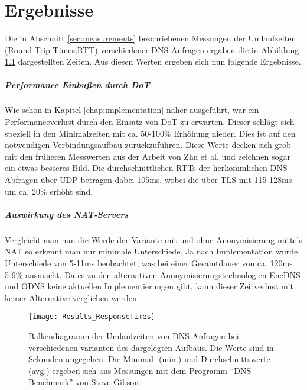 \chapter{Ergebnisse}
\label{chap:results}

Die in Abschnitt \ref{sec:measurements} beschriebenen Messungen der Umlaufzeiten (Round-Trip-Times;RTT) verschiedener DNS-Anfragen ergaben die in Abbildung \ref{img:results-times} dargestellten Zeiten. Aus diesen Werten ergeben sich nun folgende Ergebnisse.

\paragraph{Performance Einbußen durch DoT}
Wie schon in Kapitel \ref{chap:implementation} näher ausgeführt, war ein Performanceverlust durch den Einsatz von DoT zu erwarten. Dieser schlägt sich speziell in den Minimalzeiten mit ca. 50-100\% Erhöhung nieder. Dies ist auf den notwendigen Verbindungsaufbau zurückzuführen. Diese Werte decken sich grob mit den früheren Messwerten aus der Arbeit von Zhu et al.\cite{Zhu2015} und zeichnen sogar ein etwas besseres Bild. Die durchschnittlichen RTTs der herkömmlichen DNS-Abfragen über UDP betragen dabei 105ms, wobei die über TLS mit 115-128ms um ca. 20\% erhöht sind.

\paragraph{Auswirkung des NAT-Servers}
Vergleicht man nun die Werde der Variante mit und ohne Anonymisierung mittels NAT so erkennt man nur minimale Unterschiede. Ja nach Implementation wurde Unterschiede von 5-11ms beobachtet, was bei einer Gesamtdauer von ca. 120ms 5-9\% ausmacht. Da es zu den alternativen Anonymisierungstechnologien EncDNS und ODNS keine aktuellen Implementierungen gibt, kann dieser Zeitverlust mit keiner Alternative verglichen werden.

\begin{figure}[hb]
    \centering
    \texttt{[image: Results\_ResponseTimes]}
    \caption{Balkendiagramm der Umlaufzeiten von DNS-Anfragen bei verschiedenen varianten des dargelegten Aufbaus. Die Werte sind in Sekunden angegeben. Die Minimal- (min.) und Durchschnittswerte (avg.) ergeben sich aus Messungen mit dem Programm ``DNS Benchmark'' von Steve Gibson}
    \label{img:results-times}
\end{figure}